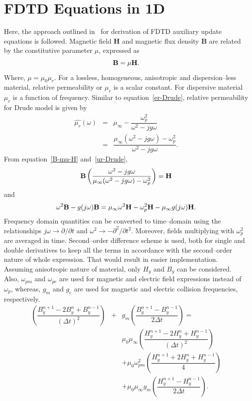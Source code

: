 \section{FDTD Equations in 1D}
Here, the approach outlined in~\cite{Radial-Zhao} for derivation of FDTD auxiliary update equations is followed. Magnetic field $\textbf{H}$ and magnetic flux density $\textbf{B}$ are related by the constitutive parameter $\mu$, expressed as
\begin{equation}
\centering
\textbf{B} = \mu \textbf{H}.
\label{B-mu-H}
\end{equation}
Where, $\mu = \mu_0 \mu_r$. For a lossless, homogeneous, anisotropic and dispersion--less material, relative permeability or $\mu_r$ is a scalar constant. For dispersive material $\mu_r$ is a function of frequency. Similar to equation~\ref{er-Drude}, relative permeability for Drude model is given by
\begin{eqnarray}
\nonumber \hat{\mu_r}(\omega)&=&\mu_\infty-\dfrac{\omega^2_p}{\omega^2-jg\omega}\\
&=&\dfrac{\mu_\infty(\omega^2-jg\omega)-\omega^2_p}{\omega^2-jg\omega}.
\label{ur-Drude}
\end{eqnarray}
From equation~\ref{B-mu-H} and~\ref{ur-Drude},
\begin{equation}
\centering
\nonumber \textbf{B} \left( \dfrac{\omega^2-jg\omega}{\mu_\infty(\omega^2-jg\omega)-\omega^2_p} \right) =\textbf{H}
\label{B-muomega-H}
\end{equation}
and
\begin{equation}
\centering
\omega^2\textbf{B}-g(j\omega)\textbf{B} = \mu_\infty\omega^2\textbf{H}-\omega^2_p\textbf{H}-\mu_\infty g(j\omega)\textbf{H}.
\label{B-muomega-H-frequency-domain}
\end{equation}
Frequency domain quantities can be converted to time--domain using the relationships $j\omega \rightarrow \partial/\partial t$ and $\omega^2 \rightarrow - \partial^2/\partial t^2$. Moreover, fields multiplying with $\omega^2_p$ are averaged in time. Second--order difference scheme is used, both for single and double derivatives to keep all the terms in accordance with the second--order nature of whole expression. That would result in easier implementation. Assuming anisotropic nature of material, only $H_y$ and $B_y$ can be considered. Also, $\omega_{pm}$ and $\omega_{pe}$ are used for magnetic and electric field expressions instead of $\omega_p$, whereas, $g_m$ and $g_e$ are used for magnetic and electric collision frequencies, respectively.
\begin{eqnarray}
\nonumber \left(\dfrac{B^{n+1}_y-2B^n_y+B^{n-1}_y}{(\Delta t)^2}\right) &+& g_m\left(\dfrac{B^{n+1}_y-B^{n-1}_y}{2\Delta t}\right) =\\
\nonumber &&\mu_0\mu_\infty\left(\dfrac{H^{n+1}_y-2H^n_y+H^{n-1}_y}{(\Delta t)^2}\right)\\
\nonumber &&+\mu_0\omega^2_{pm}\left(\dfrac{H^{n+1}_y+2H^n_y+H^{n-1}_y}{4}\right)\\
&&+\mu_0\mu_\infty g_m\left(\dfrac{H^{n+1}_y-H^{n-1}_y}{2\Delta t}\right).
\label{2nd-order-B-H}
\end{eqnarray}
